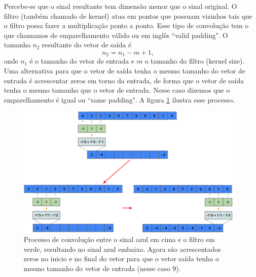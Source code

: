 \documentclass[a4paper,12pt,oneside]{book}
\begin{document}
\par Percebe-se que o sinal resultante tem dimensão menor que o sinal original. O filtro (também chamado de kernel) atua em pontos que possuam vizinhos tais que o filtro possa fazer a multiplicação ponto a ponto. Esse tipo de convolução tem o que chamamos de emparelhamento válido ou em inglês ``valid padding". O tamanho $n_2$ resultante do vetor de saída é 
\begin{equation}
    n_2 = n_1 - m + 1,
\end{equation}
%
onde $n_1$ é o tamanho do vetor de entrada e $m$ o tamanho do filtro (kernel size). Uma alternativa para que o vetor de saída tenha o mesmo tamanho do vetor de entrada é acrescentar zeros em torno da entrada, de forma que o vetor de saída tenha o mesmo tamanho que o vetor de entrada. Nesse caso dizemos que o emparelhamento é igual ou ``same padding". A figura \ref{fig:conv_same} ilustra esse processo.

\begin{figure}[H]
    \centering
    \includegraphics[scale = 0.38]{figs/conv_same.png}
    \caption{Processo de convolução entre o sinal azul em cima e o filtro em verde, resultando no sinal azul embaixo. Agora são acrescentados zeros no inicio e no final do vetor para que o vetor saída tenha o mesmo tamanho do vetor de entrada (nesse caso 9).}
    \label{fig:conv_same}
\end{figure}

\end{document}
